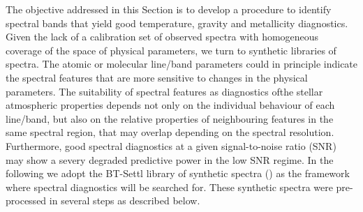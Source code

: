 { The objective addressed in this Section is to develop a procedure to
  identify spectral bands that yield good temperature, gravity and
  metallicity diagnostics. Given the lack of a calibration set of
  observed spectra with homogeneous coverage of the space of physical
  parameters, we turn to synthetic libraries of spectra. The atomic or
  molecular line/band parameters could in principle indicate the
  spectral features that are more sensitive to changes in the physical
  parameters. The suitability of spectral features as diagnostics
  ofthe stellar atmospheric properties depends not only on the
  individual behaviour of each line/band, but also on the relative
  properties of neighbouring features in the same spectral region,
  that may overlap depending on the spectral resolution. Furthermore,
  good spectral diagnostics at a given signal-to-noise ratio (SNR) may
  show a severy degraded predictive power in the low SNR regime. In
  the following we adopt the BT-Settl library of synthetic spectra
  (\cite{2013MSAIS..24..128A}) as the framework where spectral
  diagnostics will be searched for. These synthetic spectra were
  pre-processed in several steps as described below.}

